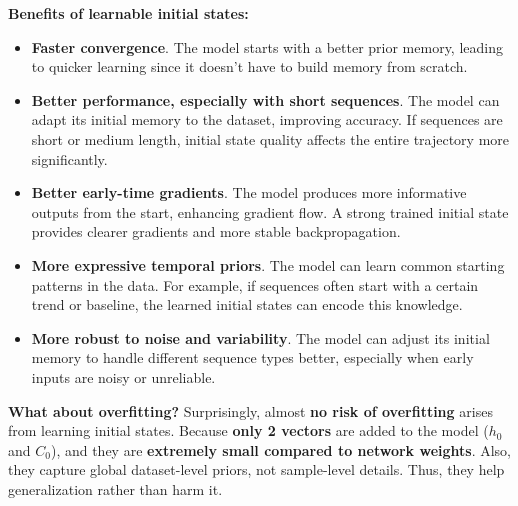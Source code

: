 \noindent
\textcolor{Green3}{ \textbf{Benefits of learnable initial states:}}
\begin{itemize}
    \item[\textcolor{Green3}{\faIcon{check}}] \textbf{Faster convergence}. The model starts with a better prior memory, leading to quicker learning since it doesn't have to build memory from scratch.
    \item[\textcolor{Green3}{\faIcon{check}}] \textbf{Better performance, especially with short sequences}. The model can adapt its initial memory to the dataset, improving accuracy. If sequences are short or medium length, initial state quality affects the entire trajectory more significantly.
    \item[\textcolor{Green3}{\faIcon{check}}] \textbf{Better early-time gradients}. The model produces more informative outputs from the start, enhancing gradient flow. A strong trained initial state provides clearer gradients and more stable backpropagation.
    \item[\textcolor{Green3}{\faIcon{check}}] \textbf{More expressive temporal priors}. The model can learn common starting patterns in the data. For example, if sequences often start with a certain trend or baseline, the learned initial states can encode this knowledge.
    \item[\textcolor{Green3}{\faIcon{check}}] \textbf{More robust to noise and variability}. The model can adjust its initial memory to handle different sequence types better, especially when early inputs are noisy or unreliable.
\end{itemize}

\highspace
\textcolor{Green3}{ \textbf{What about overfitting?}} Surprisingly, almost \textbf{no risk of overfitting} arises from learning initial states. Because \textbf{only 2 vectors} are added to the model ($h_0$ and $C_0$), and they are \textbf{extremely small compared to network weights}. Also, they capture global dataset-level priors, not sample-level details. Thus, they help generalization rather than harm it.